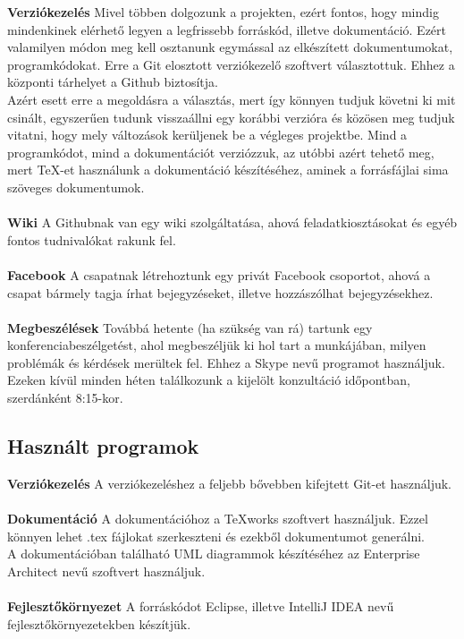 \textbf{Verziókezelés} Mivel többen dolgozunk a projekten, ezért fontos, hogy mindig mindenkinek elérhető legyen a legfrissebb forráskód, illetve dokumentáció. Ezért valamilyen módon meg kell osztanunk egymással az elkészített dokumentumokat, programkódokat. Erre a Git elosztott verziókezelő szoftvert választottuk. Ehhez a központi tárhelyet a Github biztosítja. \\ 
Azért esett erre a megoldásra a választás, mert így könnyen tudjuk követni ki mit csinált, egyszerűen tudunk visszaállni egy korábbi verzióra és közösen meg tudjuk vitatni, hogy mely változások kerüljenek be a végleges projektbe. 
Mind a programkódot, mind a dokumentációt verziózzuk, az utóbbi azért tehető meg, mert TeX-et használunk a dokumentáció készítéséhez, aminek a forrásfájlai sima szöveges dokumentumok.
\\ \\
\textbf{Wiki}
A Githubnak van egy wiki szolgáltatása, ahová feladatkiosztásokat és egyéb fontos tudnivalókat rakunk fel. \\ \\
\textbf{Facebook}
A csapatnak létrehoztunk egy privát Facebook csoportot, ahová a csapat bármely tagja írhat bejegyzéseket, illetve hozzászólhat bejegyzésekhez. \\ \\
\textbf{Megbeszélések}
Továbbá hetente (ha szükség van rá) tartunk egy konferenciabeszélgetést, ahol megbeszéljük ki hol tart a munkájában, milyen problémák és kérdések merültek fel. Ehhez a Skype nevű programot használjuk. \\
Ezeken kívül minden héten találkozunk a kijelölt konzultáció időpontban, szerdánként 8:15-kor.

\subsection{Használt programok}
\textbf{Verziókezelés} 
A verziókezeléshez a feljebb bővebben kifejtett Git-et használjuk. \\ \\ 
\textbf{Dokumentáció}
A dokumentációhoz a TeXworks szoftvert használjuk. Ezzel könnyen lehet .tex fájlokat szerkeszteni és ezekből dokumentumot generálni. \\
A dokumentációban található UML diagrammok készítéséhez az Enterprise Architect nevű szoftvert használjuk. \\ \\
\textbf{Fejlesztőkörnyezet}
A forráskódot Eclipse, illetve IntelliJ IDEA nevű fejlesztőkörnyezetekben készítjük.

